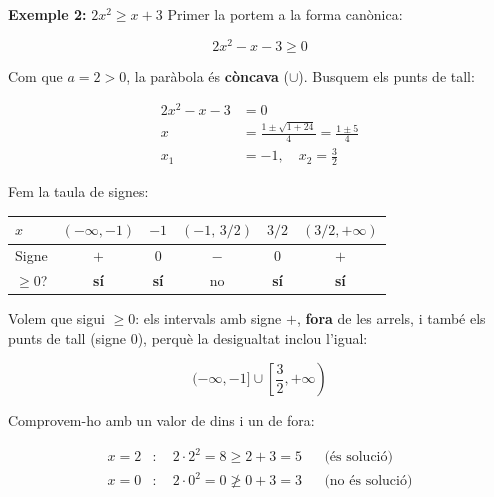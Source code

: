 \begin{exemple}{\textbf{Exemple 2:} $2x^2\geq x+3$}
Primer la portem a la forma canònica:

\[
2x^2-x-3\geq 0
\]

Com que $a=2>0$, la paràbola és \textbf{còncava} ($\cup$). Busquem els punts de tall:

\[
\begin{aligned}
2x^2-x-3&=0\\
x&=\frac{1\pm\sqrt{1+24}}{4}=\frac{1\pm 5}{4}\\
x_1&=-1,\quad x_2=\frac32
\end{aligned}
\]

\begin{center}
\end{center}

Fem la taula de signes:

\begin{center}
\begin{tabular}{lccccc}
\toprule
$x$ & $(-\infty,-1)$ & $-1$ & $(-1,\,3/2)$ & $3/2$ & $(3/2,+\infty)$ \\
\midrule
Signe & $+$ & $0$ & $-$ & $0$ & $+$ \\
$\geq 0$? & \textbf{sí} & \textbf{sí} & no & \textbf{sí} & \textbf{sí} \\
\bottomrule
\end{tabular}
\end{center}

Volem que sigui $\geq 0$: els intervals amb signe $+$, \textbf{fora} de les arrels, i també els punts de tall (signe $0$), perquè la desigualtat inclou l'igual:

\[
(-\infty,-1]\cup\left[\frac32,+\infty\right)
\]

Comprovem-ho amb un valor de dins i un de fora:

\[
\begin{aligned}
x=2&:\quad 2\cdot 2^2=8\geq 2+3=5 &&\text{(és solució)}\\
x=0&:\quad 2\cdot 0^2=0\not\geq 0+3=3 &&\text{(no és solució)}
\end{aligned}
\]
\end{exemple}

